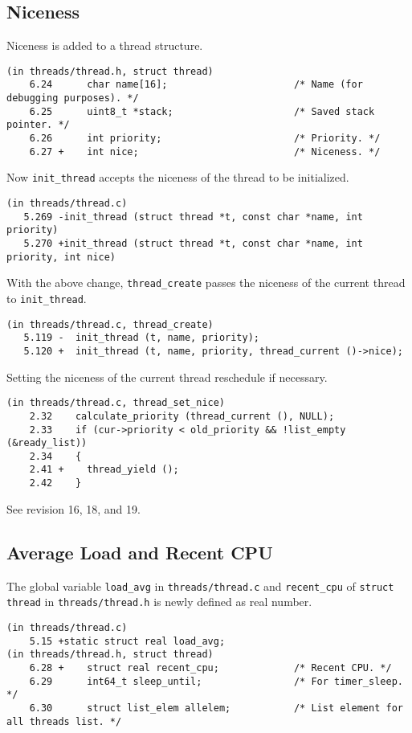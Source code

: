 \documentclass[a4paper,article,11pt,oneside]{article}
\begin{document}
\subsection{Niceness}
Niceness is added to a thread structure.
\begin{verbatim}
(in threads/thread.h, struct thread)
    6.24      char name[16];                      /* Name (for debugging purposes). */
    6.25      uint8_t *stack;                     /* Saved stack pointer. */
    6.26      int priority;                       /* Priority. */
    6.27 +    int nice;                           /* Niceness. */
\end{verbatim}
Now \texttt{init\_thread} accepts the niceness of the thread to be initialized.
\begin{verbatim}
(in threads/thread.c)
   5.269 -init_thread (struct thread *t, const char *name, int priority)
   5.270 +init_thread (struct thread *t, const char *name, int priority, int nice)
\end{verbatim}
With the above change, \texttt{thread\_create} passes the niceness of
the current thread to \texttt{init\_thread}.
\begin{verbatim}
(in threads/thread.c, thread_create)
   5.119 -  init_thread (t, name, priority);
   5.120 +  init_thread (t, name, priority, thread_current ()->nice);
\end{verbatim}

Setting the niceness of the current thread reschedule if necessary.
\begin{verbatim}
(in threads/thread.c, thread_set_nice)
    2.32    calculate_priority (thread_current (), NULL);
    2.33    if (cur->priority < old_priority && !list_empty (&ready_list))
    2.34    {
    2.41 +    thread_yield ();
    2.42    }
\end{verbatim}

See revision 16, 18, and 19.

\subsection{Average Load and Recent CPU}
The global variable \texttt{load\_avg} in \texttt{threads/thread.c} and
\texttt{recent\_cpu} of \texttt{struct thread} in
\texttt{threads/thread.h} is newly defined as real number.
\begin{verbatim}
(in threads/thread.c)
    5.15 +static struct real load_avg;
(in threads/thread.h, struct thread)
    6.28 +    struct real recent_cpu;             /* Recent CPU. */
    6.29      int64_t sleep_until;                /* For timer_sleep. */
    6.30      struct list_elem allelem;           /* List element for all threads list. */
\end{verbatim}
\end{document}
